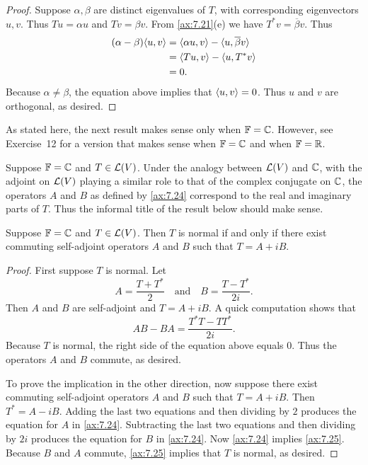 \begin{proof}
Suppose $\alpha,\beta$ are distinct eigenvalues of $T$, with corresponding
eigenvectors $u,v$. Thus $Tu=\alpha u$ and $Tv=\beta v$. From \ref{ax:7.21}(e)
we have $T^*v=\overline{\beta}v$. Thus
\begin{align*}
(\alpha-\beta)\langle u, v \rangle &= \langle \alpha u, v \rangle-\langle u, \overline{\beta}v \rangle\\
                        &= \langle Tu, v \rangle-\langle u, T^*v \rangle\\
                        &= 0.
\end{align*}
Because $\alpha\ne\beta$, the equation above implies that $\langle u, v \rangle=0$. Thus
$u$ and $v$ are orthogonal, as desired.
\end{proof}

As stated here, the next result makes sense only when $\mathbb{F}=\mathbb{C}$. However, see
Exercise~12 for a version that makes sense when $\mathbb{F}=\mathbb{C}$ and when $\mathbb{F}=\mathbb{R}$.

Suppose $\mathbb{F}=\mathbb{C}$ and $T\in\mathcal{L}(V)$. Under the analogy between $\mathcal{L}(V)$ and
$\mathbb{C}$, with the adjoint on $\mathcal{L}(V)$ playing a similar role to that of the
complex conjugate on $\mathbb{C}$, the operators $A$ and $B$ as defined by \ref{ax:7.24}
correspond to the real and imaginary parts of $T$. Thus the informal title of
the result below should make sense.

\begin{result}\label{ax:7.23}
Suppose $\mathbb{F}=\mathbb{C}$ and $T\in\mathcal{L}(V)$. Then $T$ is normal if and only if there
exist commuting self-adjoint operators $A$ and $B$ such that $T=A+iB$.
\end{result}

\begin{proof}
First suppose $T$ is normal. Let
\[ A = \frac{T+T^*}{2} \quad\text{and}\quad B = \frac{T-T^*}{2i}.
   \tag{\thetheorem} \]
Then $A$ and $B$ are self-adjoint and $T=A+iB$. A quick computation shows
that
\[ AB-BA = \frac{T^*T-TT^*}{2i}. \tag{\thetheorem} \]
Because $T$ is normal, the right side of the equation above equals $0$. Thus
the operators $A$ and $B$ commute, as desired.

To prove the implication in the other direction, now suppose there exist
commuting self-adjoint operators $A$ and $B$ such that $T=A+iB$. Then
$T^*=A-iB$. Adding the last two equations and then dividing by $2$ produces the
equation for $A$ in \ref{ax:7.24}. Subtracting the last two equations and then
dividing by $2i$ produces the equation for $B$ in \ref{ax:7.24}. Now
\ref{ax:7.24} implies \ref{ax:7.25}. Because $B$ and $A$ commute,
\ref{ax:7.25} implies that $T$ is normal, as desired.
\end{proof}

